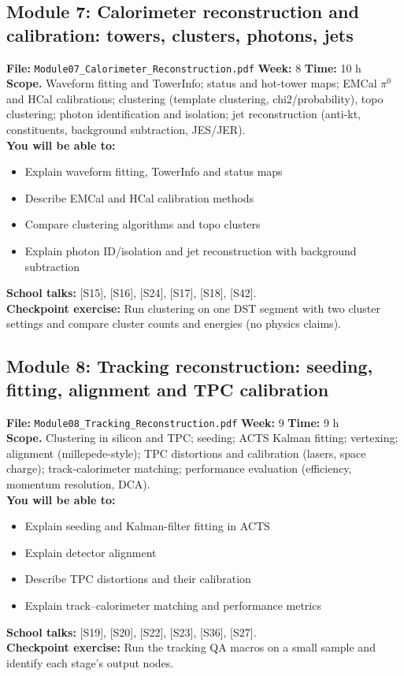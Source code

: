 \documentclass[11pt,letterpaper]{article}
\begin{document}
\subsection*{Module 7: Calorimeter reconstruction and calibration: towers, clusters, photons, jets}
\textbf{File:} \texttt{Module07\_Calorimeter\_Reconstruction.pdf} \quad \textbf{Week:} 8 \quad \textbf{Time:} 10 h\\
\textbf{Scope.} Waveform fitting and TowerInfo; status and hot-tower maps; EMCal $\pi^0$ and HCal calibrations; clustering (template clustering, chi2/probability), topo clustering; photon identification and isolation; jet reconstruction (anti-kt, constituents, background subtraction, JES/JER).\\
\textbf{You will be able to:}
\begin{itemize}
\item Explain waveform fitting, TowerInfo and status maps
\item Describe EMCal and HCal calibration methods
\item Compare clustering algorithms and topo clusters
\item Explain photon ID/isolation and jet reconstruction with background subtraction
\end{itemize}
\textbf{School talks:} [S15], [S16], [S24], [S17], [S18], [S42].\\
\textbf{Checkpoint exercise:} Run clustering on one DST segment with two cluster settings and compare cluster counts and energies (no physics claims).
\medskip
\subsection*{Module 8: Tracking reconstruction: seeding, fitting, alignment and TPC calibration}
\textbf{File:} \texttt{Module08\_Tracking\_Reconstruction.pdf} \quad \textbf{Week:} 9 \quad \textbf{Time:} 9 h\\
\textbf{Scope.} Clustering in silicon and TPC; seeding; ACTS Kalman fitting; vertexing; alignment (millepede-style); TPC distortions and calibration (lasers, space charge); track-calorimeter matching; performance evaluation (efficiency, momentum resolution, DCA).\\
\textbf{You will be able to:}
\begin{itemize}
\item Explain seeding and Kalman-filter fitting in ACTS
\item Explain detector alignment
\item Describe TPC distortions and their calibration
\item Explain track--calorimeter matching and performance metrics
\end{itemize}
\textbf{School talks:} [S19], [S20], [S22], [S23], [S36], [S27].\\
\textbf{Checkpoint exercise:} Run the tracking QA macros on a small sample and identify each stage's output nodes.
\medskip
\end{document}
